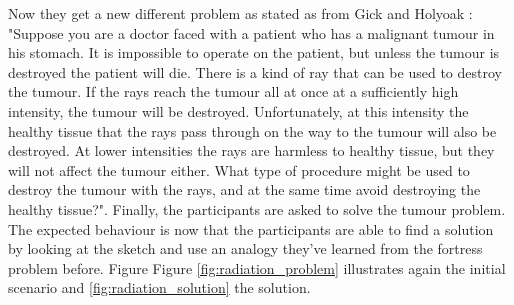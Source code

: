 \documentclass[12pt]{article}
\begin{document}
Now they get a new different problem as stated as from Gick and Holyoak \cite[307-308]{gick1980analogical}: "Suppose you are a doctor faced with a patient who has a malignant tumour in his stomach. It is impossible to operate on the patient, but unless the tumour is destroyed the patient will die. There is a kind of ray that can be used to destroy the tumour. If  the rays reach the tumour all at once at a sufficiently high intensity, the tumour will be destroyed. Unfortunately, at this intensity the healthy tissue that the rays pass through on the way to the tumour will also be destroyed. At lower intensities the rays are harmless to healthy tissue, but they will not affect the tumour either. What type of procedure might be used to destroy the tumour with the rays, and at the same time avoid destroying the healthy tissue?". Finally, the participants are asked to solve the tumour problem. The expected behaviour is now that the participants are able to find a solution by looking at the sketch and use an analogy they've learned from the fortress problem before. Figure Figure \ref{fig:radiation_problem} illustrates again the initial scenario and \ref{fig:radiation_solution} the solution.
\end{document}
